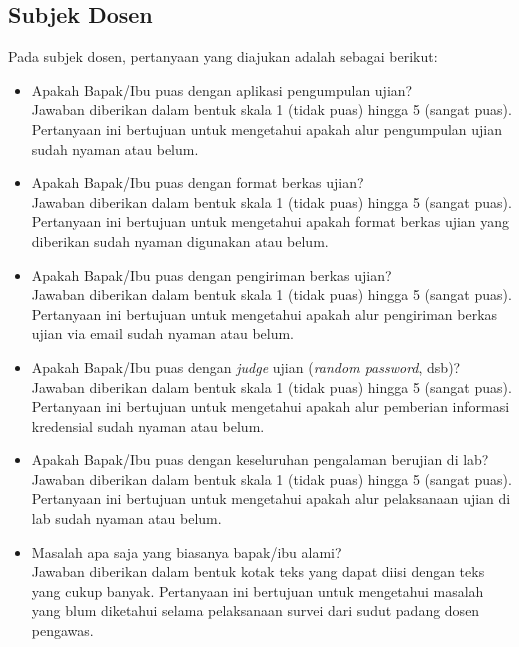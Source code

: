     \subsection{Subjek Dosen}
    Pada subjek dosen, pertanyaan yang diajukan adalah sebagai berikut:
    \begin{itemize}
        \item Apakah Bapak/Ibu puas dengan aplikasi pengumpulan ujian? \\
            Jawaban diberikan dalam bentuk skala 1 (tidak puas) hingga 5 (sangat puas). Pertanyaan ini bertujuan untuk mengetahui apakah alur pengumpulan ujian sudah nyaman atau belum.
            
        \item Apakah Bapak/Ibu puas dengan format berkas ujian? \\
            Jawaban diberikan dalam bentuk skala 1 (tidak puas) hingga 5 (sangat puas). Pertanyaan ini bertujuan untuk mengetahui apakah format berkas ujian yang diberikan sudah nyaman digunakan atau belum.
            
        \item Apakah Bapak/Ibu puas dengan pengiriman berkas ujian? \\
            Jawaban diberikan dalam bentuk skala 1 (tidak puas) hingga 5 (sangat puas). Pertanyaan ini bertujuan untuk mengetahui apakah alur pengiriman berkas ujian via email sudah nyaman atau belum.
            
        \item Apakah Bapak/Ibu puas dengan \textit{judge} ujian (\textit{random password}, dsb)? \\
            Jawaban diberikan dalam bentuk skala 1 (tidak puas) hingga 5 (sangat puas). Pertanyaan ini bertujuan untuk mengetahui apakah alur pemberian informasi kredensial sudah nyaman atau belum.
            
        \item Apakah Bapak/Ibu puas dengan keseluruhan pengalaman berujian di lab? \\
            Jawaban diberikan dalam bentuk skala 1 (tidak puas) hingga 5 (sangat puas). Pertanyaan ini bertujuan untuk mengetahui apakah alur pelaksanaan ujian di lab sudah nyaman atau belum.
            
        \item Masalah apa saja yang biasanya bapak/ibu alami? \\
            Jawaban diberikan dalam bentuk kotak teks yang dapat diisi dengan teks yang cukup banyak.
            Pertanyaan ini bertujuan untuk mengetahui masalah yang blum diketahui selama pelaksanaan survei dari sudut padang dosen pengawas.
    \end{itemize}
    

